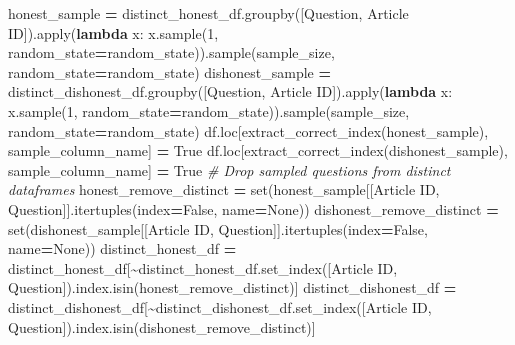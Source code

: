 \documentclass[
]{article}
\newenvironment{Shaded}{\begin{snugshade}}{\end{snugshade}}
\newcommand{\BuiltInTok}[1]{#1}
\newcommand{\CommentTok}[1]{\textcolor[rgb]{0.56,0.35,0.01}{\textit{#1}}}
\newcommand{\DecValTok}[1]{\textcolor[rgb]{0.00,0.00,0.81}{#1}}
\newcommand{\KeywordTok}[1]{\textcolor[rgb]{0.13,0.29,0.53}{\textbf{#1}}}
\newcommand{\NormalTok}[1]{#1}
\newcommand{\OperatorTok}[1]{\textcolor[rgb]{0.81,0.36,0.00}{\textbf{#1}}}
\newcommand{\StringTok}[1]{\textcolor[rgb]{0.31,0.60,0.02}{#1}}
\newcommand{\VariableTok}[1]{\textcolor[rgb]{0.00,0.00,0.00}{#1}}
\begin{document}
\begin{Shaded}
\begin{Highlighting}[]
\NormalTok{    honest\_sample }\OperatorTok{=}\NormalTok{ distinct\_honest\_df.groupby([}\StringTok{\textquotesingle{}Question\textquotesingle{}}\NormalTok{, }\StringTok{\textquotesingle{}Article ID\textquotesingle{}}\NormalTok{]).}\BuiltInTok{apply}\NormalTok{(}\KeywordTok{lambda}\NormalTok{ x: x.sample(}\DecValTok{1}\NormalTok{, random\_state}\OperatorTok{=}\NormalTok{random\_state)).sample(sample\_size, random\_state}\OperatorTok{=}\NormalTok{random\_state)}
\NormalTok{    dishonest\_sample }\OperatorTok{=}\NormalTok{ distinct\_dishonest\_df.groupby([}\StringTok{\textquotesingle{}Question\textquotesingle{}}\NormalTok{, }\StringTok{\textquotesingle{}Article ID\textquotesingle{}}\NormalTok{]).}\BuiltInTok{apply}\NormalTok{(}\KeywordTok{lambda}\NormalTok{ x: x.sample(}\DecValTok{1}\NormalTok{, random\_state}\OperatorTok{=}\NormalTok{random\_state)).sample(sample\_size, random\_state}\OperatorTok{=}\NormalTok{random\_state)}
\NormalTok{    df.loc[extract\_correct\_index(honest\_sample), sample\_column\_name] }\OperatorTok{=} \VariableTok{True}
\NormalTok{    df.loc[extract\_correct\_index(dishonest\_sample), sample\_column\_name] }\OperatorTok{=} \VariableTok{True}
    \CommentTok{\# Drop sampled questions from distinct dataframes}
\NormalTok{    honest\_remove\_distinct }\OperatorTok{=} \BuiltInTok{set}\NormalTok{(honest\_sample[[}\StringTok{\textquotesingle{}Article ID\textquotesingle{}}\NormalTok{, }\StringTok{\textquotesingle{}Question\textquotesingle{}}\NormalTok{]].itertuples(index}\OperatorTok{=}\VariableTok{False}\NormalTok{, name}\OperatorTok{=}\VariableTok{None}\NormalTok{))}
\NormalTok{    dishonest\_remove\_distinct }\OperatorTok{=} \BuiltInTok{set}\NormalTok{(dishonest\_sample[[}\StringTok{\textquotesingle{}Article ID\textquotesingle{}}\NormalTok{, }\StringTok{\textquotesingle{}Question\textquotesingle{}}\NormalTok{]].itertuples(index}\OperatorTok{=}\VariableTok{False}\NormalTok{, name}\OperatorTok{=}\VariableTok{None}\NormalTok{))}
\NormalTok{    distinct\_honest\_df }\OperatorTok{=}\NormalTok{ distinct\_honest\_df[}\OperatorTok{\textasciitilde{}}\NormalTok{distinct\_honest\_df.set\_index([}\StringTok{\textquotesingle{}Article ID\textquotesingle{}}\NormalTok{, }\StringTok{\textquotesingle{}Question\textquotesingle{}}\NormalTok{]).index.isin(honest\_remove\_distinct)]}
\NormalTok{    distinct\_dishonest\_df }\OperatorTok{=}\NormalTok{ distinct\_dishonest\_df[}\OperatorTok{\textasciitilde{}}\NormalTok{distinct\_dishonest\_df.set\_index([}\StringTok{\textquotesingle{}Article ID\textquotesingle{}}\NormalTok{, }\StringTok{\textquotesingle{}Question\textquotesingle{}}\NormalTok{]).index.isin(dishonest\_remove\_distinct)]}

\end{Highlighting}
\end{Shaded}
\end{document}
